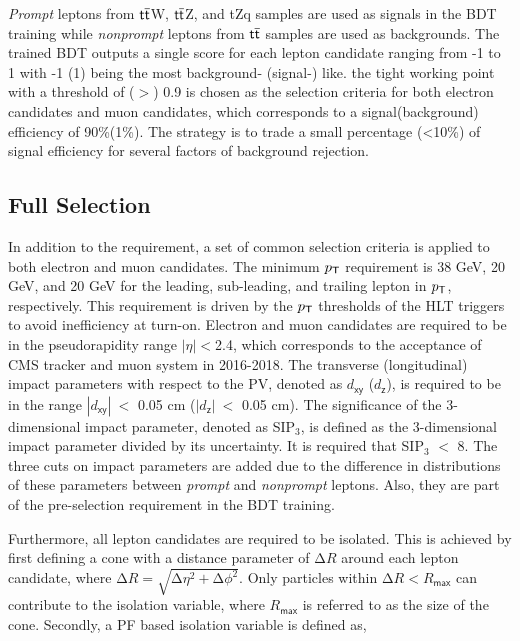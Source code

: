 \emph{Prompt} leptons from $\textsf{t}\overline{\textsf{t}}$W, $\textsf{t}\overline{\textsf{t}}$Z, and tZq samples are used as signals in the \ac{BDT} training while \emph{nonprompt} leptons from $\textsf{t}\overline{\textsf{t}}$ samples are used as backgrounds. The trained \ac{BDT} outputs a single score for each lepton candidate ranging from -1 to 1 with -1 (1) being the most background- (signal-) like. the tight working point with a threshold of ($>$) 0.9 is chosen as the selection criteria for both electron candidates and muon candidates, which corresponds to a signal(background) efficiency of 90\%(1\%). The strategy is to trade a small percentage (<10\%) of signal efficiency for several factors of background rejection. 
\subsection{Full Selection}
\label{subsec:FullSel}

In addition to the \TOP requirement, a set of common selection criteria is applied to both electron and muon candidates. The minimum $p_{\textsf{T}}$ requirement is 38 GeV, 20 GeV, and 20 GeV for the leading, sub-leading, and trailing lepton in $p_{\textsf{T}}$, respectively. This requirement is driven by the $p_{\textsf{T}}$ thresholds of the \ac{HLT} triggers to avoid inefficiency at turn-on. Electron and muon candidates are required to be in the pseudorapidity range $|\eta|<$2.4, which corresponds to the acceptance of \ac{CMS} tracker and muon system in 2016-2018. The transverse (longitudinal) impact parameters with respect to the \ac{PV}, denoted as $d_{\textsf{xy}}$ ($d_{\textsf{z}}$), is required to be in the range $|d_{\textsf{xy}}|~<$ 0.05 cm ($|d_{\textsf{z}}|~<$ 0.05 cm). The significance of the 3-dimensional impact parameter, denoted as SIP$_3$, is defined as the 3-dimensional impact parameter divided by its uncertainty. It is required that SIP$_3$ $<$ 8. The three cuts on impact parameters are added due to the difference in distributions of these parameters between \emph{prompt} and \emph{nonprompt} leptons. Also, they are part of the pre-selection requirement in the \ac{BDT} training.

Furthermore, all lepton candidates are required to be isolated. This is achieved by first defining a cone with a distance parameter of $\mathrm{\Delta}R$ around each lepton candidate, where $\mathrm{\Delta}R=\sqrt{\mathrm{\Delta}\eta^2+\mathrm{\Delta}\phi^2}$. Only particles within $\mathrm{\Delta}R<R_{\textsf{max}}$ can contribute to the isolation variable, where $R_{\textsf{max}}$ is referred to as the size of the cone. Secondly, a \ac{PF} based isolation variable is defined as,

